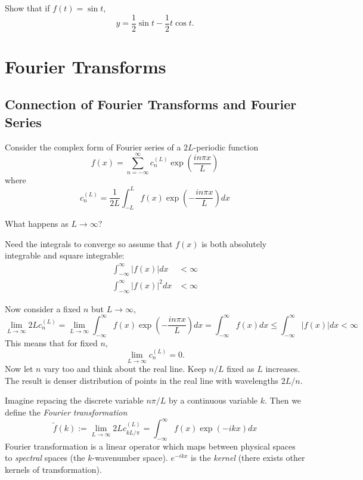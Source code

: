 \documentclass[a4paper]{article}
\newcommand*{\ft}{\tilde}
\begin{document}
\begin{ex}
  Show that if \(f(t) = \sin t\),
  \[
    y = \frac{1}{2} \sin t - \frac{1}{2} t\cos t.
  \]
\end{ex}

\section{Fourier Transforms}

\subsection{Connection of Fourier Transforms and Fourier Series}

Consider the complex form of Fourier series of a \(2L\)-periodic function
\[
  f(x) = \sum_{n = -\infty}^{\infty} c_n^{(L)} \exp ( \frac{in\pi x}{L} )
\]
where
\[
  c_n^{(L)} = \frac{1}{2L} \int_{-L}^{L} f(x) \exp (- \frac{in\pi x}{L}) dx
\]

\begin{question}
  What happens as \(L \to \infty\)?
\end{question}

Need the integrals to converge so assume that \(f(x)\) is both absolutely integrable and square integrable:
\begin{align*}
  \int_{-\infty}^{\infty} |f(x)| dx &< \infty \\
  \int_{-\infty}^{\infty} |f(x)|^2 dx &< \infty
\end{align*}

Now consider a fixed \(n\) but \(L \to \infty\),
\[
  \lim_{L \to \infty} 2L c_n^{(L)} = \lim_{L \to \infty} \int_{-\infty}^{\infty} f(x) \exp (-\frac{in\pi x}{L}) dx = \int_{-\infty}^{\infty} f(x) dx \leq \int_{-\infty}^{\infty} |f(x)| dx < \infty
\]
This means that for fixed \(n\),
\[
  \lim_{L \to \infty} c_n^{(L)} = 0.
\]
Now let \(n\) vary too and think about the real line. Keep \(n/L\) fixed as \(L\) increases. The result is denser distribution of points in the real line with wavelengths \(2L/n\).

Imagine repacing the discrete variable \(n\pi/L\) by a continuous variable \(k\). Then we define the \emph{Fourier transformation}
\[
  \ft f(k) := \lim_{L \to \infty} 2L c_{kL/\pi}^{(L)} = \int_{-\infty}^{\infty} f(x) \exp(-ikx) dx
\]
Fourier transformation is a linear operator which maps between physical spaces to \emph{spectral} spaces (the \(k\)-wavenumber space). \(e^{-ikx}\) is the \emph{kernel} (there exists other kernels of transformation).
\end{document}
